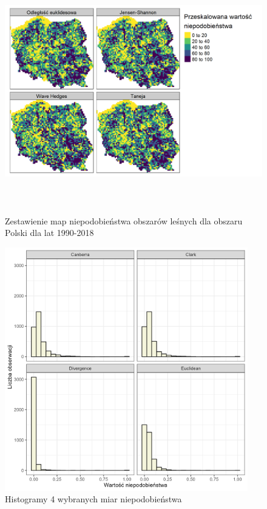 \documentclass{amuthesis}
\begin{document}
\begin{figure}[t]

{\centering \includegraphics[width=5.83333in,height=4.16667in]{figures/zestawienie_miar1.png}

}

\caption{\label{fig-zestawienie_miar1}Zestawienie map niepodobieństwa
obszarów leśnych dla obszaru Polski dla lat 1990-2018}

\end{figure}

\begin{figure}[t]

{\centering \includegraphics[width=4.16667in,height=4.16667in]{figures/zestawienie_hist1.png}

}

\caption{\label{fig-zestawienie_hist1}Histogramy 4 wybranych miar
niepodobieństwa}

\end{figure}
\end{document}
